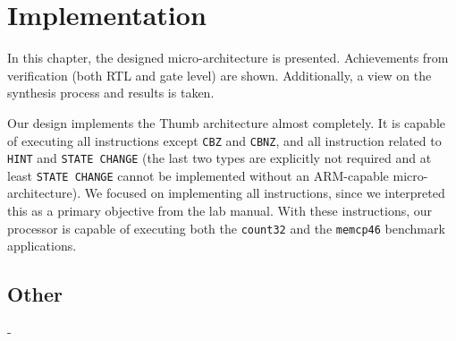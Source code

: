 \chapter{Implementation}
\label{cha:implementation}

In this chapter, the designed micro-architecture is presented. Achievements from verification (both RTL and gate level) are shown. Additionally, a view on the synthesis process and results is taken.

Our design implements the Thumb architecture almost completely. It is capable of executing all instructions except \texttt{CBZ} and \texttt{CBNZ}, and all instruction related to \texttt{HINT} and \texttt{STATE CHANGE} (the last two types are explicitly not required and at least \texttt{STATE CHANGE} cannot be implemented without an ARM-capable micro-architecture). We focused on implementing all instructions, since we interpreted this as a primary objective from the lab manual. With these instructions, our processor is capable of executing both the \texttt{count32} and the \texttt{memcp46} benchmark applications.






\section{Other}
\label{sec:other}

- 